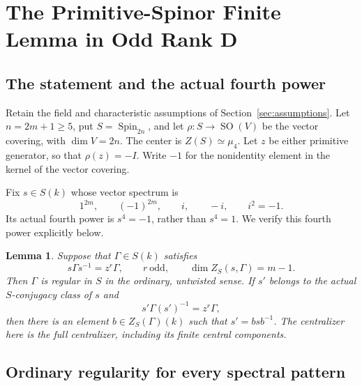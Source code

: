 \documentclass[11pt,a4paper]{article}
\newtheorem{lemma}[theorem]{Lemma}
\theoremstyle{definition}
\theoremstyle{remark}
\begin{document}
\section{The Primitive-Spinor Finite Lemma in Odd Rank D}
\label{sec:odd-d}

\subsection{The statement and the actual fourth power}

Retain the field and characteristic assumptions of
Section~\ref{sec:assumptions}.  Let \(n=2m+1\geq 5\), put
\(S=\operatorname{Spin}_{2n}\), and let
\(\rho:S\to\operatorname{SO}(V)\) be the vector covering, with
\(\dim V=2n\).  The center is \(Z(S)\simeq\mu_4\).  Let \(z\) be either
primitive generator, so that \(\rho(z)=-I\).  Write \(-1\) for the
nonidentity element in the kernel of the vector covering.

Fix \(s\in S(k)\) whose vector spectrum is
\[
1^{2m},\qquad (-1)^{2m},\qquad i,\qquad -i,\qquad i^2=-1.
\]
Its actual fourth power is \(s^4=-1\), rather than \(s^4=1\).
We verify this fourth power explicitly below.

\begin{lemma}\label{lem:odd-d-primitive-spinor}
Suppose that \(\Gamma\in S(k)\) satisfies
\[
s\Gamma s^{-1}=z^r\Gamma,\qquad
r\ \text{odd},\qquad
\dim Z_S(s,\Gamma)=m-1.
\]
Then \(\Gamma\) is regular in \(S\) in the ordinary, untwisted sense.
If \(s'\) belongs to the actual \(S\)-conjugacy class of \(s\) and
\[
s'\Gamma(s')^{-1}=z^r\Gamma,
\]
then there is an element \(b\in Z_S(\Gamma)(k)\) such that
\(s'=bsb^{-1}\).
The centralizer here is the full centralizer, including its finite
central components.
\end{lemma}

\subsection{Ordinary regularity for every spectral pattern}
\end{document}
